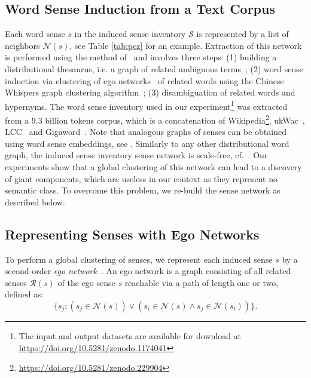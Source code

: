 \documentclass[10pt, a4paper]{article}
\begin{document}
\subsection{Word Sense Induction from a Text Corpus   }
\label{sec:induction}

 Each word sense $s$ in the induced sense inventory $\mathcal{S}$ is represented by a list of neighbors $\mathcal{N}(s)$, see Table \ref{tab:pcz} for an example.
 Extraction of this network is performed using the method of~ and involves three steps: (1) building a distributional thesaurus, i.e. a graph of related ambiguous terms~\cite{Biemann:13}; (2) word sense induction via clustering of ego networks~\cite{widdows2002graph,everett2005ego} of related words using the Chinese Whispers graph clustering algorithm~\cite{Biemann:06}; (3) disambiguation of related words and hypernyms. The word sense inventory used in our experiment\footnote{The input and output datasets are available for download at \url{https://doi.org/10.5281/zenodo.1174041}}
was extracted from a 9.3 billion tokens corpus, which is a concatenation of  Wikipedia\footnote{\url{https://doi.org/10.5281/zenodo.229904}}, ukWac~\cite{ferraresi2008introducing}, LCC~\cite{LCC} and Gigaword~\cite{graff2003english}. Note that analogous graphs of senses can be obtained using word sense embeddings, see \cite{neelakantanefficient,bartunov2015breaking}. Similarly to any other distributional word graph, the induced sense inventory sense network is scale-free, cf.~\cite{steyvers2005large}. Our experiments show that a global clustering of this network can lead to a discovery of giant components, which are useless in our context as they represent no semantic class. To overcome this problem, we re-build the sense network as described below.     

\subsection{Representing Senses with Ego Networks}

To  perform a global clustering of senses, we represent each induced sense $s$ by a second-order \textit{ego network}~\cite{everett2005ego}. An ego network is a graph  consisting of all related senses $\mathcal{R}(s)$ of the ego sense $s$ reachable via a path of length one or two, defined as: 
%
\begin{equation}
\{s_j : (s_j \in \mathcal{N}(s)) \vee (s_i \in \mathcal{N}(s) \wedge s_j \in \mathcal{N}(s_i))\}.
\end{equation}
\end{document}

